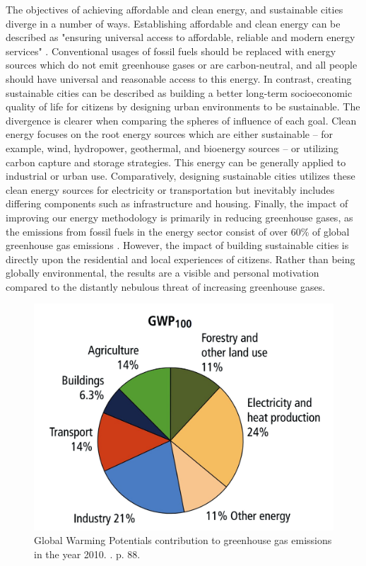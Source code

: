 \documentclass[10pt, oneside, letterpaper]{article}
\begin{document}
\begin{multicols}{2}
	The objectives of achieving affordable and clean energy, and sustainable cities diverge in a number of ways. Establishing affordable and clean energy can be described as "ensuring universal access to affordable, reliable and modern energy services" \cite{UNcities}. Conventional usages of fossil fuels should be replaced with energy sources which do not emit greenhouse gases or are carbon-neutral, and all people should have universal and reasonable access to this energy. In contrast, creating sustainable cities can be described as building a better long-term socioeconomic quality of life for citizens by designing urban environments to be sustainable.  The divergence is clearer when comparing the spheres of influence of each goal. Clean energy focuses on the root energy sources which are either sustainable – for example, wind, hydropower, geothermal, and bioenergy sources \cite{Blakers2015} – or utilizing carbon capture and storage strategies. This energy can be generally applied to industrial or urban use. Comparatively, designing sustainable cities utilizes these clean energy sources for electricity or transportation but inevitably includes differing components such as infrastructure and housing. Finally, the impact of improving our energy methodology is primarily in reducing greenhouse gases, as the emissions from fossil fuels in the energy sector consist of over 60\% of global greenhouse gas emissions \cite{Blakers2015}. However, the impact of building sustainable cities is directly upon the residential and local experiences of citizens. Rather than being globally environmental, the results are a visible and personal motivation compared to the distantly nebulous threat of increasing greenhouse gases.
	
	\begin{figure}[H]
		\centering
		\includegraphics[width=\linewidth]{global-warming-potential}
		\caption{Global Warming Potentials contribution to greenhouse gas emissions in the year 2010. \protect\cite{Pachauri2014}. p. 88.}
		\label{fig:global-warming-potentials}
	\end{figure}
	

\end{multicols}
\end{document}
